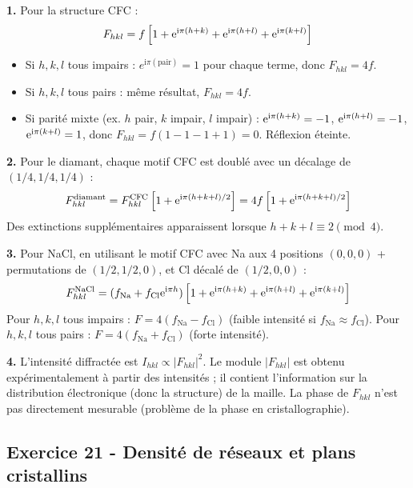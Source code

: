 \documentclass[12pt,a4paper]{article}
\begin{document}
\begin{boitecorrige}
\textbf{1.} Pour la structure CFC :
\[
F_{hkl} = f\left[1 + \mathrm{e}^{\mathrm{i}\pi(h+k)} + \mathrm{e}^{\mathrm{i}\pi(h+l)} + \mathrm{e}^{\mathrm{i}\pi(k+l)}\right]
\]
\begin{itemize}[nosep]
  \item Si $h,k,l$ tous impairs : $e^{\mathrm{i}\pi(\text{pair})}=1$ pour chaque terme, donc $F_{hkl}=4f$.
  \item Si $h,k,l$ tous pairs : même résultat, $F_{hkl}=4f$.
  \item Si parité mixte (ex. $h$ pair, $k$ impair, $l$ impair) : $\mathrm{e}^{\mathrm{i}\pi(h+k)}=-1$, $\mathrm{e}^{\mathrm{i}\pi(h+l)}=-1$, $\mathrm{e}^{\mathrm{i}\pi(k+l)}=1$, donc $F_{hkl}=f(1-1-1+1)=0$. Réflexion éteinte.
\end{itemize}

\textbf{2.} Pour le diamant, chaque motif CFC est doublé avec un décalage de $(1/4,1/4,1/4)$ :
\[
F_{hkl}^\text{diamant} = F_{hkl}^\text{CFC}\left[1 + \mathrm{e}^{\mathrm{i}\pi(h+k+l)/2}\right] = 4f\left[1 + \mathrm{e}^{\mathrm{i}\pi(h+k+l)/2}\right]
\]
Des extinctions supplémentaires apparaissent lorsque $h+k+l \equiv 2\pmod{4}$.

\textbf{3.} Pour NaCl, en utilisant le motif CFC avec Na aux 4 positions $(0,0,0)$ + permutations de $(1/2,1/2,0)$, et Cl décalé de $(1/2,0,0)$ :
\[
F_{hkl}^\text{NaCl} = (f_\text{Na} + f_\text{Cl}\mathrm{e}^{\mathrm{i}\pi h})\left[1 + \mathrm{e}^{\mathrm{i}\pi(h+k)} + \mathrm{e}^{\mathrm{i}\pi(h+l)} + \mathrm{e}^{\mathrm{i}\pi(k+l)}\right]
\]
Pour $h,k,l$ tous impairs : $F = 4(f_\text{Na}-f_\text{Cl})$ (faible intensité si $f_\text{Na}\approx f_\text{Cl}$).
Pour $h,k,l$ tous pairs : $F = 4(f_\text{Na}+f_\text{Cl})$ (forte intensité).

\textbf{4.} L'intensité diffractée est $I_{hkl} \propto |F_{hkl}|^2$. Le module $|F_{hkl}|$ est obtenu expérimentalement à partir des intensités ; il contient l'information sur la distribution électronique (donc la structure) de la maille. La phase de $F_{hkl}$ n'est pas directement mesurable (problème de la phase en cristallographie).
\end{boitecorrige}

\subsection*{Exercice 21 - Densité de réseaux et plans cristallins \niveau{\moyen}}
\end{document}
